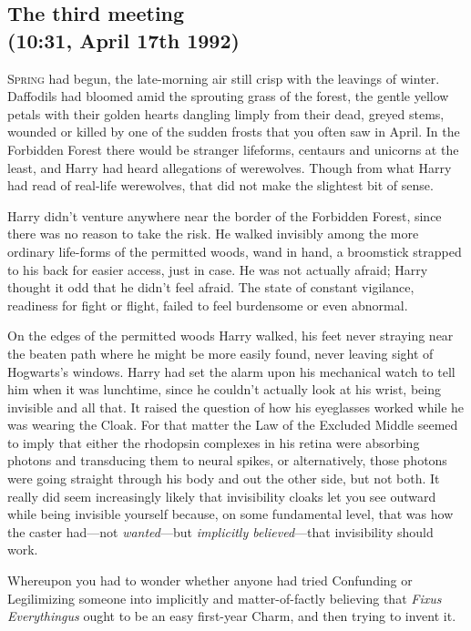 
\subsection{The third meeting\\
(10:31\AM, April 17th 1992)}

\lettrine{S}{pring} had begun, the late-morning air still crisp with the leavings of winter.
Daffodils had bloomed amid the sprouting grass of the forest, the gentle yellow
petals with their golden hearts dangling limply from their dead, greyed stems,
wounded or killed by one of the sudden frosts that you often saw in April. In
the Forbidden Forest there would be stranger lifeforms, centaurs and unicorns
at the least, and Harry had heard allegations of werewolves. Though from what
Harry had read of real-life werewolves, that did not make the slightest bit of
sense.

Harry didn't venture anywhere near the border of the Forbidden Forest, since
there was no reason to take the risk. He walked invisibly among the more
ordinary life-forms of the permitted woods, wand in hand, a broomstick strapped
to his back for easier access, just in case. He was not actually afraid; Harry
thought it odd that he didn't feel afraid. The state of constant vigilance,
readiness for fight or flight, failed to feel burdensome or even abnormal.

On the edges of the permitted woods Harry walked, his feet never straying near
the beaten path where he might be more easily found, never leaving sight of
Hogwarts's windows. Harry had set the alarm upon his mechanical watch to tell
him when it was lunchtime, since he couldn't actually look at his wrist, being
invisible and all that. It raised the question of how his eyeglasses worked
while he was wearing the Cloak. For that matter the Law of the Excluded Middle
seemed to imply that either the rhodopsin complexes in his retina were
absorbing photons and transducing them to neural spikes, or alternatively,
those photons were going straight through his body and out the other side, but
not both. It really did seem increasingly likely that invisibility cloaks let
you see outward while being invisible yourself because, on some fundamental
level, that was how the caster had—not \emph{wanted}—but \emph{implicitly
believed}—that invisibility should work.

Whereupon you had to wonder whether anyone had tried Confunding or Legilimizing
someone into implicitly and matter-of-factly believing that \emph{Fixus
Everythingus} ought to be an easy first-year Charm, and then trying to invent
it.

